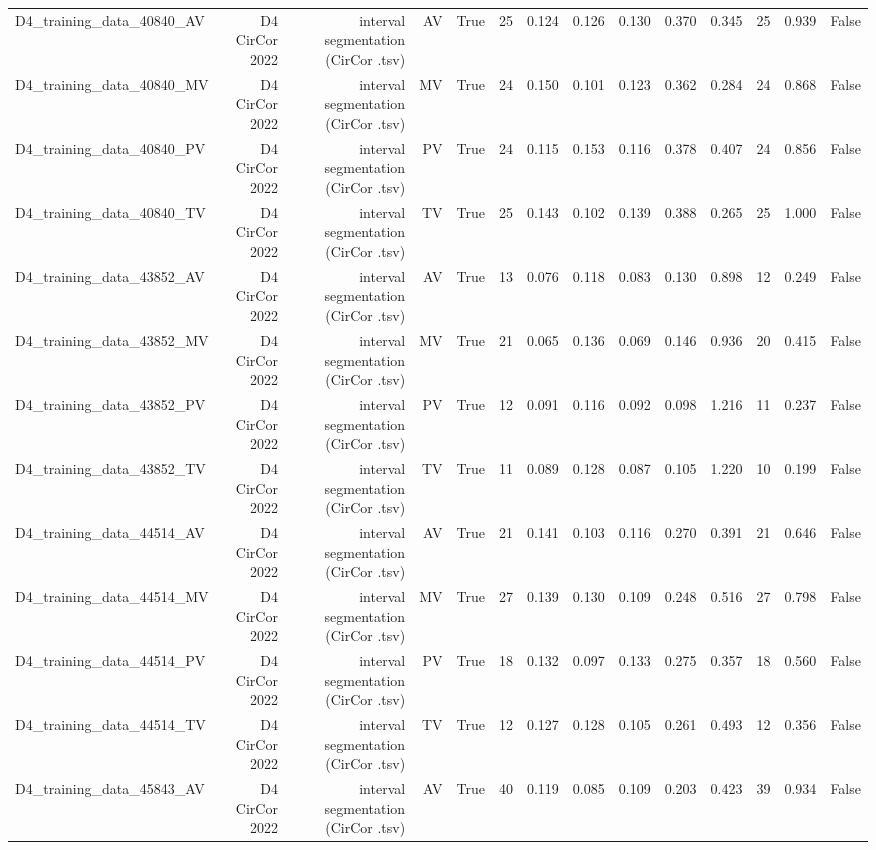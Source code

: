 \begin{table}[htbp]
\begin{tabular}{lrrrrrrrrrrrrr}
    D4\_training\_data\_40840\_AV & D4 CirCor 2022 & interval segmentation (CirCor .tsv) & AV & True & 25 & 0.124 & 0.126 & 0.130 & 0.370 & 0.345 & 25 & 0.939 & False \\
    D4\_training\_data\_40840\_MV & D4 CirCor 2022 & interval segmentation (CirCor .tsv) & MV & True & 24 & 0.150 & 0.101 & 0.123 & 0.362 & 0.284 & 24 & 0.868 & False \\
    D4\_training\_data\_40840\_PV & D4 CirCor 2022 & interval segmentation (CirCor .tsv) & PV & True & 24 & 0.115 & 0.153 & 0.116 & 0.378 & 0.407 & 24 & 0.856 & False \\
    D4\_training\_data\_40840\_TV & D4 CirCor 2022 & interval segmentation (CirCor .tsv) & TV & True & 25 & 0.143 & 0.102 & 0.139 & 0.388 & 0.265 & 25 & 1.000 & False \\
    D4\_training\_data\_43852\_AV & D4 CirCor 2022 & interval segmentation (CirCor .tsv) & AV & True & 13 & 0.076 & 0.118 & 0.083 & 0.130 & 0.898 & 12 & 0.249 & False \\
    D4\_training\_data\_43852\_MV & D4 CirCor 2022 & interval segmentation (CirCor .tsv) & MV & True & 21 & 0.065 & 0.136 & 0.069 & 0.146 & 0.936 & 20 & 0.415 & False \\
    D4\_training\_data\_43852\_PV & D4 CirCor 2022 & interval segmentation (CirCor .tsv) & PV & True & 12 & 0.091 & 0.116 & 0.092 & 0.098 & 1.216 & 11 & 0.237 & False \\
    D4\_training\_data\_43852\_TV & D4 CirCor 2022 & interval segmentation (CirCor .tsv) & TV & True & 11 & 0.089 & 0.128 & 0.087 & 0.105 & 1.220 & 10 & 0.199 & False \\
    D4\_training\_data\_44514\_AV & D4 CirCor 2022 & interval segmentation (CirCor .tsv) & AV & True & 21 & 0.141 & 0.103 & 0.116 & 0.270 & 0.391 & 21 & 0.646 & False \\
    D4\_training\_data\_44514\_MV & D4 CirCor 2022 & interval segmentation (CirCor .tsv) & MV & True & 27 & 0.139 & 0.130 & 0.109 & 0.248 & 0.516 & 27 & 0.798 & False \\
    D4\_training\_data\_44514\_PV & D4 CirCor 2022 & interval segmentation (CirCor .tsv) & PV & True & 18 & 0.132 & 0.097 & 0.133 & 0.275 & 0.357 & 18 & 0.560 & False \\
    D4\_training\_data\_44514\_TV & D4 CirCor 2022 & interval segmentation (CirCor .tsv) & TV & True & 12 & 0.127 & 0.128 & 0.105 & 0.261 & 0.493 & 12 & 0.356 & False \\
    D4\_training\_data\_45843\_AV & D4 CirCor 2022 & interval segmentation (CirCor .tsv) & AV & True & 40 & 0.119 & 0.085 & 0.109 & 0.203 & 0.423 & 39 & 0.934 & False \\

\end{tabular}
\end{table}
